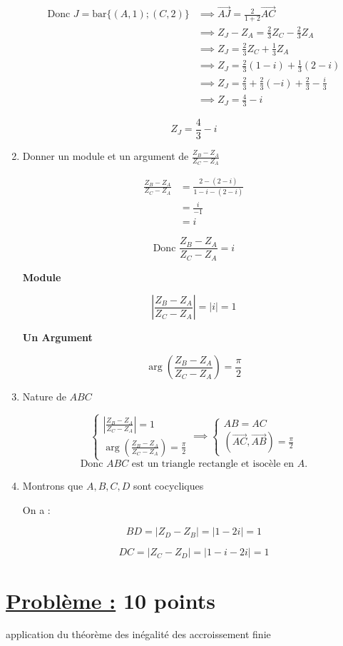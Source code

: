 \documentclass[12pt,a4paper]{article}
\begin{document}
\begin{enumerate}
\begin{align*}
\text{Donc } J = \text{bar}\{(A,1); (C,2)\} &\implies \overrightarrow{AJ} = \frac{2}{1+2} \overrightarrow{AC}\\
															 &\implies Z_J - Z_A = \frac{2}{3} Z_C - \frac{2}{3} Z_A\\
                               &\implies Z_J = \frac{2}{3} Z_C + \frac{1}{3} Z_A\\
                               &\implies Z_J = \frac{2}{3} (1 - i) + \frac{1}{3} (2 - i)\\
                               &\implies Z_J = \frac{2}{3} + \frac{2}{3} (-i) + \frac{2}{3} - \frac{i}{3}\\
                               &\implies Z_J = \frac{4}{3} - i
\end{align*}

\[
\boxed{Z_J = \frac{4}{3} - i}
\]

\item Donner un module et un argument de $\frac{Z_B - Z_A}{Z_C - Z_A}$

\begin{align*}
\frac{Z_B - Z_A}{Z_C - Z_A} &= \frac{2 - (2 - i)}{1 - i - (2 - i)}\\
														&= \frac{i}{-1}\\
														&= i
\end{align*}

\[
\text{Donc } \boxed{\frac{Z_B - Z_A}{Z_C - Z_A} = i}
\]

\textbf{Module}

\[
\left| \frac{Z_B - Z_A}{Z_C - Z_A} \right| = |i| = 1
\]

\textbf{Un Argument}

\[
\arg\left( \frac{Z_B - Z_A}{Z_C - Z_A} \right) = \frac{\pi}{2}
\]

\item Nature de $ABC$

\[
\begin{cases}
\left| \frac{Z_B - Z_A}{Z_C - Z_A} \right| = 1\\
\arg\left( \frac{Z_B - Z_A}{Z_C - Z_A} \right) = \frac{\pi}{2} 
\end{cases}\implies
\begin{cases}
AB = AC\\
\left(\overrightarrow{AC},\overrightarrow{AB} \right) = \frac{\pi}{2}
\end{cases}
\]
\[
\text{Donc } ABC \text{ est un triangle rectangle et isocèle en } A.
\]

\item Montrons que $A, B, C, D$ sont cocycliques

On a :

\[
BD = |Z_D - Z_B| = |1 - 2i| = 1
\]

\[
DC = |Z_C - Z_D| = |1 - i - 2i| = 1
\]
\end{enumerate}

\section*{\underline{Problème :} 10 points}

application du théorème des inégalité des accroissement finie
\end{document}
